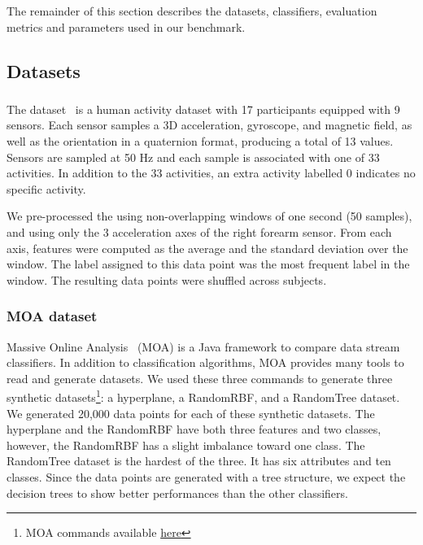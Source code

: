 The remainder of this section describes the datasets, classifiers,
evaluation metrics and parameters used in our benchmark.

\subsection{Datasets}
\subsubsection{\banosdataset}
The \banosdataset dataset~\cite{Banos_2014} is a human
activity dataset with 17 participants
equipped with 9 sensors. Each sensor samples a 3D
acceleration, gyroscope, and magnetic field, as well as 
the orientation in a quaternion format, producing a total of 13 values.
Sensors are
sampled at 50 Hz and each sample is associated
with one of 33 activities. In
addition to the 33 activities, an extra activity
labelled 0 indicates no specific activity.

We pre-processed the \banosdataset using
non-overlapping windows of one second (50
samples), and using only the 3 acceleration axes of the
right forearm sensor. From each axis, features were computed as the
average and the standard deviation over the window. The label assigned to this data
point was the most frequent label in the window.
The resulting data points were shuffled
across subjects.

\subsubsection{MOA dataset}
Massive Online Analysis~\cite{moa} (MOA) is a Java framework to compare
data stream classifiers. In addition to classification algorithms, MOA provides many
tools to read and generate datasets.
We used these three commands to
generate three synthetic datasets\footnote{MOA commands available
\href{https://github.com/azazel7/paper-benchmark/blob/e0c9a94d0d17490f7ab14293dec20b8322a6447c/Makefile\#L90}{here}}:
a hyperplane, a RandomRBF, and a RandomTree
dataset. We generated 20,000 data points
 for each of these synthetic datasets.
The hyperplane and the RandomRBF have both three features and two classes, however, the RandomRBF has a slight imbalance toward one class.
The RandomTree dataset is the hardest of the three. It has six attributes and
ten classes. Since the data points are generated with a tree structure, we
expect the decision trees to show better performances than the other
classifiers.

